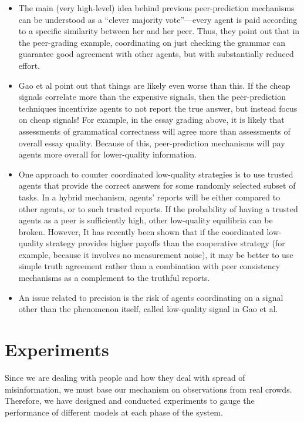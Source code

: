 \documentclass{report}
\theoremstyle{definition}
\begin{document}
\begin{itemize}

    \item The main (very high-level) idea behind previous peer-prediction mechanisms can be understood as a “clever majority vote”—every agent is paid according to a specific similarity between her and her peer. Thus, they point out that in the peer-grading example, coordinating on just checking the grammar can guarantee good agreement with other agents, but with substantially reduced effort.\cite{kong:noverify}
    
    \item Gao et al point out that things are likely even worse than this. If the cheap signals correlate more than the expensive signals, then the peer-prediction techniques incentivize agents to not report the true answer, but instead focus on cheap signals! For example, in the essay grading above, it is likely that assessments of grammatical correctness will agree more than assessments of overall essay quality. Because of this, peer-prediction mechanisms will pay agents more overall for lower-quality information.\cite{kong:noverify}
    
    \item One approach to counter coordinated low-quality strategies is to use trusted agents that provide the correct answers for some randomly selected subset of tasks. In a hybrid mechanism, agents’ reports will be either compared to other agents, or to such trusted reports. If the probability of having a trusted agents as a peer is sufficiently high, other low-quality equilibria can be broken. However, It has recently been shown that if the coordinated low-quality strategy provides higher payoffs than the cooperative strategy (for example, because it involves no measurement noise), it may be better to use simple truth agreement rather than a combination with peer consistency mechanisms as a complement to the truthful reports.\cite{boi:book, gao:peer}
    
    \item An issue related to precision is the risk of agents coordinating on a signal other than the phenomenon itself, called low-quality signal in Gao et al.\cite{gao:peer}
\end{itemize}








\chapter{Experiments}
Since we are dealing with people and how they deal with spread of misinformation, we must base our mechanism on observations from real crowds. Therefore, we have designed and conducted experiments to gauge the performance of different models at each phase of the system.
\end{document}

